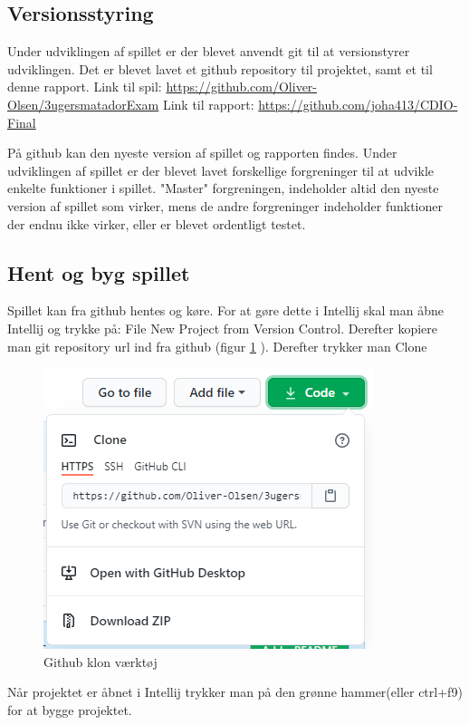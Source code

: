 \subsection{Versionsstyring}
Under udviklingen af spillet er der blevet anvendt git til at versionstyrer udviklingen. Det er blevet lavet et github repository til projektet, samt et til denne rapport.
\newline
Link til spil: \url{https://github.com/Oliver-Olsen/3ugersmatadorExam}
\newline
Link til rapport: \url{https://github.com/joha413/CDIO-Final}

På github kan den nyeste version af spillet og rapporten findes. 
Under udviklingen af spillet er der blevet lavet forskellige forgreninger til at udvikle enkelte funktioner i spillet. "Master" forgreningen, indeholder altid den nyeste version af spillet som virker, mens de andre forgreninger indeholder funktioner der endnu ikke virker, eller er blevet ordentligt testet. 

\subsection{Hent og byg spillet}
Spillet kan fra github hentes og køre. For at gøre dette i Intellij skal man åbne Intellij og trykke på: File \textrightarrow New \textrightarrow Project from Version Control. Derefter kopiere man git repository url ind fra github (figur \ref{fig:git} ). Derefter trykker man Clone

\begin{figure}[h]
    \centering
    \includegraphics{sources/git.PNG}
    \caption{Github klon værktøj}
    \label{fig:git}
\end{figure}

Når projektet er åbnet i Intellij trykker man på den grønne hammer(eller ctrl+f9) for at bygge projektet.



